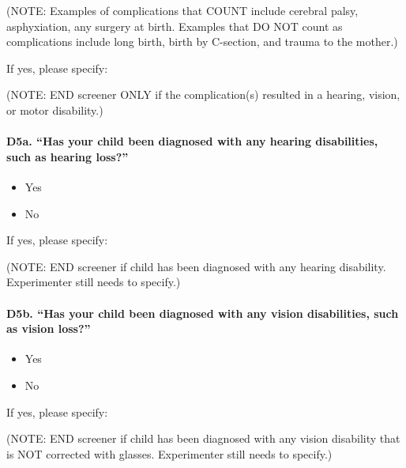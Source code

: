 \documentclass[
  12pt,
]{book}
\providecommand{\tightlist}{%
  \setlength{\itemsep}{0pt}\setlength{\parskip}{0pt}}
\begin{document}
(NOTE: Examples of complications that COUNT include cerebral palsy, asphyxiation, any surgery at birth. Examples that DO NOT count as complications include long birth, birth by C-section, and trauma to the mother.)

If yes, please specify:

(NOTE: END screener ONLY if the complication(s) resulted in a hearing, vision, or motor disability.)

\hypertarget{d5a.-has-your-child-been-diagnosed-with-any-hearing-disabilities-such-as-hearing-loss}{%
\paragraph*{D5a. ``Has your child been diagnosed with any hearing disabilities, such as hearing loss?''}\label{d5a.-has-your-child-been-diagnosed-with-any-hearing-disabilities-such-as-hearing-loss}}

\begin{itemize}
\tightlist
\item
  Yes
\item
  No
\end{itemize}

If yes, please specify:

(NOTE: END screener if child has been diagnosed with any hearing disability. Experimenter still needs to specify.)

\hypertarget{d5b.-has-your-child-been-diagnosed-with-any-vision-disabilities-such-as-vision-loss}{%
\paragraph*{D5b. ``Has your child been diagnosed with any vision disabilities, such as vision loss?''}\label{d5b.-has-your-child-been-diagnosed-with-any-vision-disabilities-such-as-vision-loss}}

\begin{itemize}
\tightlist
\item
  Yes
\item
  No
\end{itemize}

If yes, please specify:

(NOTE: END screener if child has been diagnosed with any vision disability that is NOT corrected with glasses. Experimenter still needs to specify.)
\end{document}
